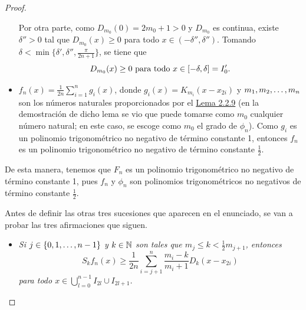 \documentclass[a4paper, 12pt, oneside]{book}
\begin{document}
\begin{proof}
\begin{itemize}
        Por otra parte, como $D_{m_0}(0) = 2m_0+1 > 0$ y $D_{m_0}$ es continua, existe $\delta'' > 0$ tal que $D_{m_0}(x) \geq 0$ para todo $x \in (-\delta'',\delta'')$. Tomando $\delta < \min\{\delta',\delta'',\frac{\pi}{2n+1}\}$, se tiene que
        \begin{equation}\label{2.2.14}
            D_{m_0}(x) \geq 0 \textup{ para todo } x \in [-\delta,\delta] = I_0'.
        \end{equation}
        \item $f_n(x) = \frac{1}{2n}\sum_{i=1}^n g_i(x)$, donde $g_i(x)= K_{m_i}(x-x_{2i})$ y $m_1,m_2,\mathellipsis,m_n$ son los números naturales proporcionados por el \hyperref[2.2.9]{\color{blue}Lema 2.2.9} (en la demostración de dicho lema se vio que puede tomarse como $m_0$ cualquier número natural; en este caso, se escoge como $m_0$ el grado de $\phi_n$). Como $g_i$ es un polinomio trigonométrico no negativo de término constante 1, entonces $f_n$ es un polinomio trigonométrico no negativo de término constante $\frac{1}{2}$.
    \end{itemize}

    De esta manera, tenemos que $F_n$ es un polinomio trigonométrico no negativo de término constante 1, pues $f_n$ y $\phi_n$ son polinomios trigonométricos no negativos de término constante $\frac{1}{2}$.

    Antes de definir las otras tres sucesiones que aparecen en el enunciado, se van a probar las tres afirmaciones que siguen.

    \begin{itemize}
        \item \textit{Si $j \in \{0,1,\mathellipsis,n-1\}$ y $k \in \mathbb N$ son tales que $m_j \leq k < \frac{1}{2}m_{j+1}$, entonces
        \begin{equation}\label{2.2.15}
            S_kf_n(x) \geq \frac{1}{2n}\sum_{i=j+1}^n \frac{m_i-k}{m_i+1}D_k(x-x_{2i})
        \end{equation}
        para todo $x \in \bigcup_{l=0}^{n-1}I_{2l}\cup I_{2l+1}$.}


\end{itemize}
\end{proof}
\end{document}
